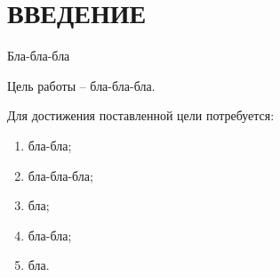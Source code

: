 \section*{ВВЕДЕНИЕ}

Бла-бла-бла

Цель работы -- бла-бла-бла.

Для достижения поставленной цели потребуется:
\begin{enumerate}[leftmargin=1.6\parindent]
\item бла-бла;
\item бла-бла-бла;
\item бла;
\item бла-бла;
\item бла.
\end{enumerate}

\pagebreak